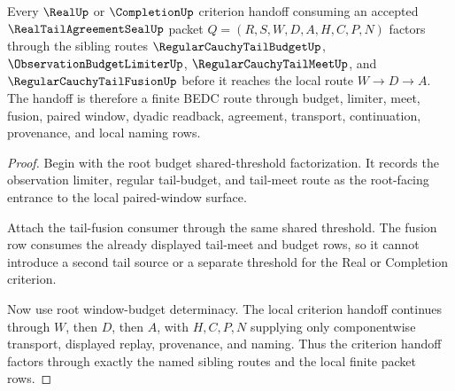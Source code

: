 \begin{theorem}
\label{thm:real-tail-agreement-seal-root-criterion-handoff}
Every $\RealUp$ or $\CompletionUp$ criterion handoff consuming an accepted $\RealTailAgreementSealUp$ packet $Q=(R,S,W,D,A,H,C,P,N)$ factors through the sibling routes $\RegularCauchyTailBudgetUp$, $\ObservationBudgetLimiterUp$, $\RegularCauchyTailMeetUp$, and $\RegularCauchyTailFusionUp$ before it reaches the local route $W \to D \to A$. The handoff is therefore a finite BEDC route through budget, limiter, meet, fusion, paired window, dyadic readback, agreement, transport, continuation, provenance, and local naming rows.
\end{theorem}
\begin{proof}
Begin with the root budget shared-threshold factorization. It records the observation limiter, regular tail-budget, and tail-meet route as the root-facing entrance to the local paired-window surface.

Attach the tail-fusion consumer through the same shared threshold. The fusion row consumes the already displayed tail-meet and budget rows, so it cannot introduce a second tail source or a separate threshold for the Real or Completion criterion.

Now use root window-budget determinacy. The local criterion handoff continues through $W$, then $D$, then $A$, with $H,C,P,N$ supplying only componentwise transport, displayed replay, provenance, and naming. Thus the criterion handoff factors through exactly the named sibling routes and the local finite packet rows.
\end{proof}

